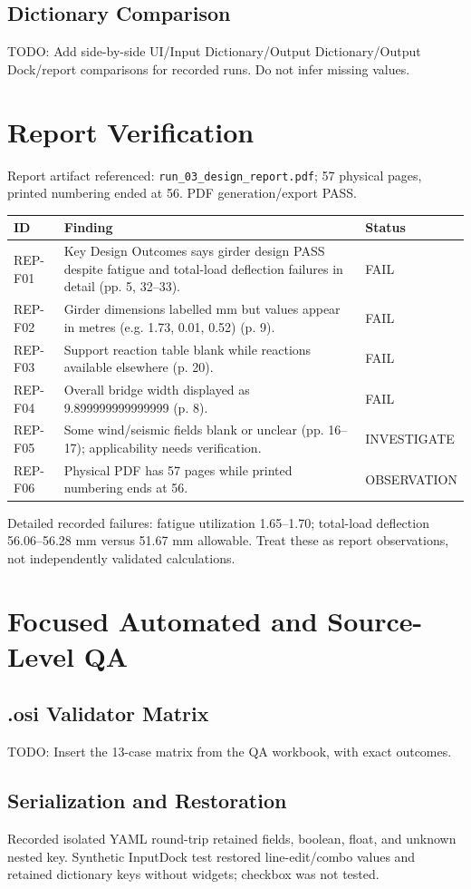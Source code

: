 \documentclass[11pt,a4paper]{report}
\begin{document}
\section{Dictionary Comparison}
TODO: Add side-by-side UI/Input Dictionary/Output Dictionary/Output Dock/report comparisons for recorded runs. Do not infer missing values.

\chapter{Report Verification}
Report artifact referenced: \texttt{run\_03\_design\_report.pdf}; 57 physical pages, printed numbering ended at 56. PDF generation/export PASS.
\begin{longtable}{p{}p{}p{}}
\toprule ID & Finding & Status\\\midrule
REP-F01 & Key Design Outcomes says girder design PASS despite fatigue and total-load deflection failures in detail (pp. 5, 32--33). & FAIL\\
REP-F02 & Girder dimensions labelled mm but values appear in metres (e.g. 1.73, 0.01, 0.52) (p. 9). & FAIL\\
REP-F03 & Support reaction table blank while reactions available elsewhere (p. 20). & FAIL\\
REP-F04 & Overall bridge width displayed as 9.899999999999999 (p. 8). & FAIL\\
REP-F05 & Some wind/seismic fields blank or unclear (pp. 16--17); applicability needs verification. & INVESTIGATE\\
REP-F06 & Physical PDF has 57 pages while printed numbering ends at 56. & OBSERVATION\\
\bottomrule
\end{longtable}
Detailed recorded failures: fatigue utilization 1.65--1.70; total-load deflection 56.06--56.28 mm versus 51.67 mm allowable. Treat these as report observations, not independently validated calculations.

\chapter{Focused Automated and Source-Level QA}
\section{.osi Validator Matrix}
TODO: Insert the 13-case matrix from the QA workbook, with exact outcomes.
\section{Serialization and Restoration}
Recorded isolated YAML round-trip retained fields, boolean, float, and unknown nested key. Synthetic InputDock test restored line-edit/combo values and retained dictionary keys without widgets; checkbox was not tested.
\end{document}
